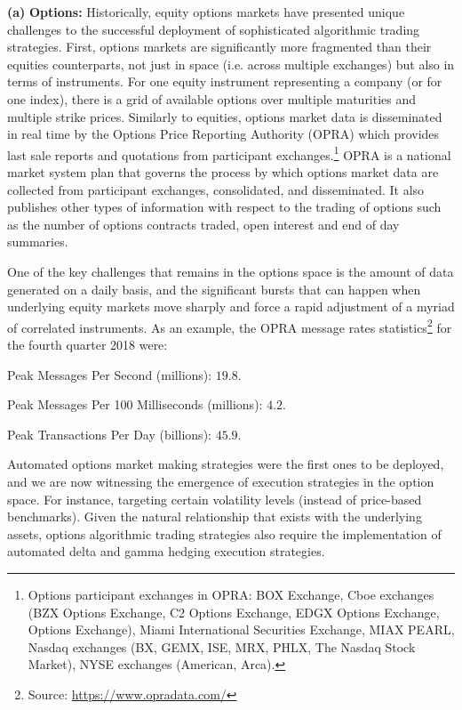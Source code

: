 \noindent\textbf{(a)} \textbf{Options:} Historically, equity options markets have presented unique challenges to the successful deployment of sophisticated algorithmic trading strategies. First, options markets are significantly more fragmented than their equities counterparts, not just in space (i.e. across multiple exchanges) but also in terms of instruments. For one equity instrument representing a company (or for one index), there is a grid of available options over multiple maturities and multiple strike prices. Similarly to equities, options market data is disseminated in real time by the Options Price Reporting Authority (OPRA) which provides last sale reports and quotations from participant exchanges.\footnote{Options participant exchanges in OPRA: BOX Exchange, Cboe exchanges (BZX Options Exchange, C2 Options Exchange, EDGX Options Exchange, Options Exchange), Miami International Securities Exchange, MIAX PEARL, Nasdaq exchanges (BX, GEMX, ISE, MRX, PHLX, The Nasdaq Stock Market), NYSE exchanges (American, Arca).} OPRA is a national market system plan that governs the process by which options market data are collected from participant exchanges, consolidated, and disseminated. It also publishes other types of information with respect to the trading of options such as the number of options contracts traded, open interest and end of day summaries. 


One of the key challenges that remains in the options space is the amount of data generated on a daily basis, and the significant bursts that can happen when underlying equity markets move sharply and force a rapid adjustment of a myriad of correlated instruments. As an example, the OPRA message rates statistics\footnote{Source: \url{https://www.opradata.com/}} for the fourth quarter 2018 were: \twomedskip

\noindent Peak Messages Per Second (millions): $19.8$.

\noindent Peak Messages Per 100 Milliseconds (millions): $4.2$.

\noindent Peak Transactions Per Day (billions): $45.9$. \twomedskip


Automated options market making strategies were the first ones to be deployed, and we are now witnessing the emergence of execution strategies in the option space. For instance, targeting certain volatility levels (instead of price-based benchmarks). Given the natural relationship that exists with the underlying assets, options algorithmic trading strategies also require the implementation of automated delta and gamma hedging execution strategies.


